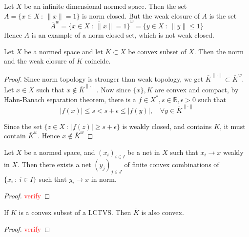 
\chapter{}

\begin{example}
  Let $X$ be an infinite dimensional normed space. Then the set $A = \{ x
  \in X  \ : \  \|x\| = 1 \}$ is norm closed. But the weak closure of
  $A$ is the set \[
    \overline{ A}^w  = \overline{\{ x \in X  \ : \  \|x\| = 1 \}}^{w}
    = \{ y \in X  \ : \  \|y\| \le 1 \}
  \]
  Hence $A$ is an example of a norm closed set, which is not weak closed.
\end{example}

\begin{theorem}
  Let $X$ be a normed space and let $K \subset X$ be convex subset of
  $X$. Then the norm and the weak closure of $K$ coincide.
\end{theorem}
\begin{proof}
  Since norm topology is stronger than weak topology, we get
  $\overline{K}^{\|\cdot\|} \subset \overline{ K}^{w}$.
  Let $ x \in X$ such that $x \notin \overline{K}^{\|\cdot\|}$. Now
  since $ \{ x \}, K$ are convex and compact, by Hahn-Banach
  separation theorem, there is a $f \in X^*, s \in \mathbb{R},
  \epsilon > 0$ such that \[
    |f(x)| \le s < s + \epsilon \le |f(y)|, \quad \forall y \in
    \overline{K}^{\|\cdot\|}
  \]

  Since the set $\{ z \in X  \ : \  |f(z)| \ge s + \epsilon \}$ is
  weakly closed, and contains $K$, it must contain $\overline{K}^w$.
  Hence $ x \notin \overline{K}^w$
\end{proof}

\begin{corollary}
  Let $X$ be a normed space, and $(x_i)_{i \in I}$ be a net in $X$
  such that $x_i \to x$ weakly in $X$. Then there exists a net
  $(y_j)_{j \in J}$ of finite convex combinations of $\{ x_i  \ : \ i
  \in I  \}$ such that $y_i \to x$ in norm.
\end{corollary}
\begin{proof}
  \textcolor{red}{verify}
\end{proof}

\begin{proposition}
  If $K$ is a convex subset of a LCTVS. Then $\overline{K}$ is also convex.
\end{proposition}
\begin{proof}
  \textcolor{red}{verify}
\end{proof}

